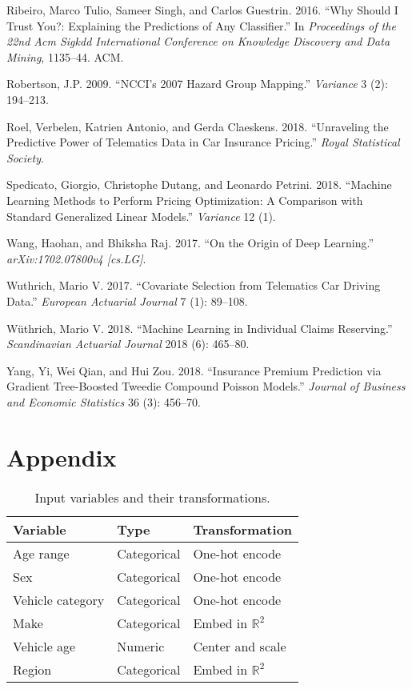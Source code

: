 \documentclass[preprint, 3p, twocolumn, letterpaper, 10pt]{elsarticle} %
\begin{document}
\leavevmode\hypertarget{ref-ribeiro2016should}{}%
Ribeiro, Marco Tulio, Sameer Singh, and Carlos Guestrin. 2016. ``Why Should I Trust You?: Explaining the Predictions of Any Classifier.'' In \emph{Proceedings of the 22nd Acm Sigkdd International Conference on Knowledge Discovery and Data Mining}, 1135--44. ACM.

\leavevmode\hypertarget{ref-robertson_2009}{}%
Robertson, J.P. 2009. ``NCCI's 2007 Hazard Group Mapping.'' \emph{Variance} 3 (2): 194--213.

\leavevmode\hypertarget{ref-roel_2018}{}%
Roel, Verbelen, Katrien Antonio, and Gerda Claeskens. 2018. ``Unraveling the Predictive Power of Telematics Data in Car Insurance Pricing.'' \emph{Royal Statistical Society}.

\leavevmode\hypertarget{ref-spedicato_2018}{}%
Spedicato, Giorgio, Christophe Dutang, and Leonardo Petrini. 2018. ``Machine Learning Methods to Perform Pricing Optimization: A Comparison with Standard Generalized Linear Models.'' \emph{Variance} 12 (1).

\leavevmode\hypertarget{ref-wang_raj_2017}{}%
Wang, Haohan, and Bhiksha Raj. 2017. ``On the Origin of Deep Learning.'' \emph{arXiv:1702.07800v4 {[}cs.LG{]}}.

\leavevmode\hypertarget{ref-wuthrich_2017}{}%
Wuthrich, Mario V. 2017. ``Covariate Selection from Telematics Car Driving Data.'' \emph{European Actuarial Journal} 7 (1): 89--108.

\leavevmode\hypertarget{ref-wuthrichMachineLearning2018}{}%
Wüthrich, Mario V. 2018. ``Machine Learning in Individual Claims Reserving.'' \emph{Scandinavian Actuarial Journal} 2018 (6): 465--80.

\leavevmode\hypertarget{ref-yang_2018}{}%
Yang, Yi, Wei Qian, and Hui Zou. 2018. ``Insurance Premium Prediction via Gradient Tree-Boosted Tweedie Compound Poisson Models.'' \emph{Journal of Business and Economic Statistics} 36 (3): 456--70.

\appendix

\hypertarget{appendix}{%
\section*{Appendix}\label{appendix}}

\begin{table}[!h]

\caption{\label{tab:variables}Input variables and their transformations.}
\centering
\begin{tabular}[t]{lll}
\toprule
Variable & Type & Transformation\\
\midrule
Age range & Categorical & One-hot encode\\
Sex & Categorical & One-hot encode\\
Vehicle category & Categorical & One-hot encode\\
Make & Categorical & Embed in $\mathbb{R}^2$\\
Vehicle age & Numeric & Center and scale\\
Region & Categorical & Embed in $\mathbb{R}^2$\\
\bottomrule
\end{tabular}
\end{table}
\end{document}
